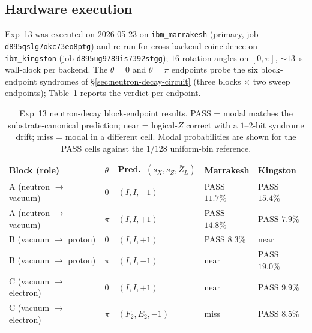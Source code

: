 \documentclass[11pt]{article}
\newcommand{\barZ}{\bar Z_L}
\begin{document}
\subsection{Hardware execution}
\label{sec:neutron-decay-execution}

Exp~13 was executed on 2026-05-23 on \texttt{ibm\_marrakesh} (primary, job \texttt{d895qslg7okc73eo8ptg}) and re-run for cross-backend coincidence on \texttt{ibm\_kingston} (job \texttt{d895ug9789is7392stgg}); $16$ rotation angles on $[0, \pi]$, $\sim 13$~s wall-clock per backend.  The $\theta = 0$ and $\theta = \pi$ endpoints probe the six block-endpoint syndromes of \S\ref{sec:neutron-decay-circuit} (three blocks $\times$ two sweep endpoints); Table~\ref{tab:exp13-results} reports the verdict per endpoint.

\begin{table}[H]
\centering
\caption{Exp~13 neutron-decay block-endpoint results.  PASS = modal matches the substrate-canonical prediction; near = logical-$Z$ correct with a $1$--$2$-bit syndrome drift; miss = modal in a different cell.  Modal probabilities are shown for the PASS cells against the $1/128$ uniform-bin reference.}
\label{tab:exp13-results}
\small
\begin{tabular}{lllll}
\toprule
Block (role) & $\theta$ & Pred.\ $(s_X, s_Z, \barZ)$ & Marrakesh & Kingston \\
\midrule
A (neutron $\to$ vacuum) & $0$   & $(I, I, -1)$     & PASS $11.7\%$ & PASS $15.4\%$ \\
A (neutron $\to$ vacuum) & $\pi$ & $(I, I, +1)$     & PASS $14.8\%$ & PASS $7.9\%$ \\
B (vacuum $\to$ proton)  & $0$   & $(I, I, +1)$     & PASS $8.3\%$  & near \\
B (vacuum $\to$ proton)  & $\pi$ & $(I, I, -1)$     & near          & PASS $19.0\%$ \\
C (vacuum $\to$ electron) & $0$  & $(I, I, +1)$     & near          & PASS $9.9\%$ \\
C (vacuum $\to$ electron) & $\pi$ & $(F_2, E_2, -1)$ & miss          & PASS $8.5\%$ \\
\bottomrule
\end{tabular}
\end{table}
\end{document}
